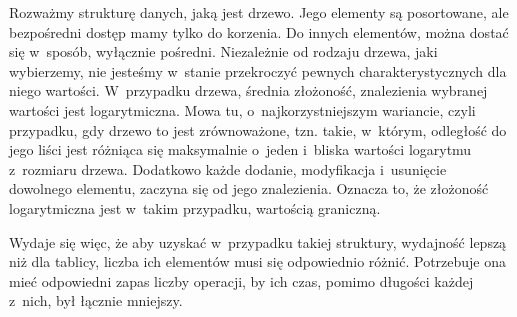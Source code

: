 Rozważmy strukturę danych, jaką jest drzewo. Jego elementy są posortowane, ale bezpośredni dostęp mamy tylko do korzenia. Do innych elementów, można dostać się w~sposób, wyłącznie pośredni. Niezależnie od rodzaju drzewa, jaki wybierzemy, nie jesteśmy w~stanie przekroczyć pewnych charakterystycznych dla niego wartości. W~przypadku drzewa, średnia złożoność, znalezienia wybranej wartości jest logarytmiczna. Mowa tu, o~najkorzystniejszym wariancie, czyli przypadku, gdy drzewo to jest zrównoważone, tzn. takie, w~którym, odległość do jego liści jest różniąca się maksymalnie o~jeden i~bliska wartości logarytmu z~rozmiaru drzewa. Dodatkowo każde dodanie, modyfikacja i~usunięcie dowolnego elementu, zaczyna się od jego znalezienia. Oznacza to, że złożoność logarytmiczna jest w~takim przypadku, wartością graniczną.

Wydaje się więc, że aby uzyskać w~przypadku takiej struktury, wydajność lepszą niż dla tablicy, liczba ich elementów musi się odpowiednio różnić. Potrzebuje ona mieć odpowiedni zapas liczby operacji, by ich czas, pomimo długości każdej z~nich, był łącznie mniejszy.	

